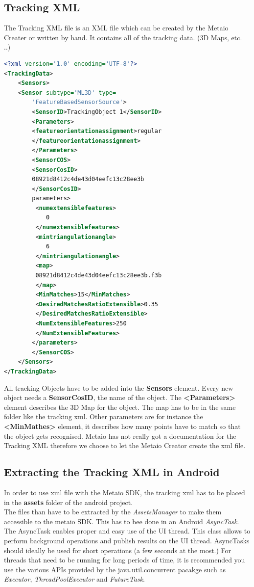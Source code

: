 \subsection{Tracking XML}
The Tracking XML file is an XML file which can be created by the Metaio Creater or written by hand. It contains all of the tracking data. (3D Maps, etc. ..)
\begin{lstlisting}[language=xml, caption=Tracking XML example]
<?xml version='1.0' encoding='UTF-8'?>
<TrackingData>
	<Sensors>
	<Sensor subtype='ML3D' type=
		'FeatureBasedSensorSource'>
		<SensorID>TrackingObject 1</SensorID>
		<Parameters>
		<featureorientationassignment>regular
		</featureorientationassignment>
		</Parameters>
		<SensorCOS>
		<SensorCosID>
		08921d8412c4de43d04eefc13c28ee3b
		</SensorCosID>
		parameters>
		 <numextensiblefeatures>
		 	0
		 </numextensiblefeatures>
		 <mintriangulationangle>
		 	6
		 </mintriangulationangle>
		 <map>
		 08921d8412c4de43d04eefc13c28ee3b.f3b
		 </map>
		 <MinMatches>15</MinMatches>
		 <DesiredMatchesRatioExtensible>0.35
		 </DesiredMatchesRatioExtensible>
		 <NumExtensibleFeatures>250
		 </NumExtensibleFeatures>
		</parameters>
		</SensorCOS>	
	</Sensors>
</TrackingData>
\end{lstlisting}
All tracking Objects have to be added into the \textbf{Sensors} element. Every new object needs a \textbf{SensorCosID}, the name of the object. The \textbf{<Parameters>} element describes the 3D Map for the object. The map has to be in the same folder like the tracking xml. Other parameters are for instance the  \textbf{<MinMathes>} element, it describes how many points have to match so that the object gets recognised. Metaio has not really got a documentation for the Tracking XML therefore we choose to let the Metaio Creator create the xml file.


\subsection{Extracting the Tracking XML in Android}
In order to use xml file with the Metaio SDK, the tracking xml has to be placed in the \textbf{assets} folder of the android project.
\\


The files than have to be extracted by the \textit{AssetsManager} to make them accessible to the metaio SDK. This has to bee done in an Android \textit{AsyncTask}.
\\

The AsyncTask enables proper and easy use of the UI thread. This class allows to perform background operations and publish results on the UI thread. AsyncTasks should ideally be used for short operations (a few seconds at the most.) For threads that need to be running for long periods of time, it is recommended you use the various APIs provided by the java.util.concurrent pacakge such as \textit{Executor}, \textit{ThreadPoolExecutor} and \textit{FutureTask}.\cite{andoirdAsyncTask} 

